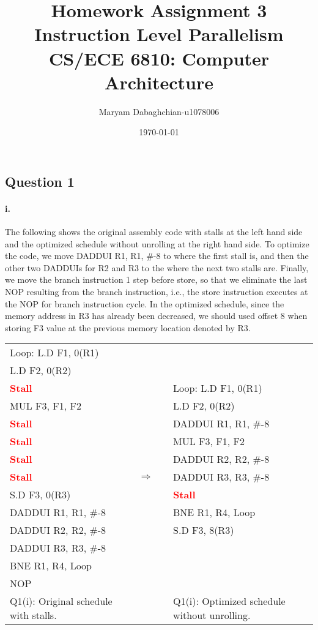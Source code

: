 \documentclass[11pt]{article}
\title{Homework Assignment 3\\
	Instruction Level Parallelism\\
	CS/ECE 6810: Computer Architecture}
\author{Maryam Dabaghchian-u1078006}
\date{\today}
\newcommand{\q}[1]{\subsection*{Question {#1}}}
\renewcommand{\part}[1]{\paragraph*{{#1}.}}
\newcommand{\code}[1]{\textsf{#1}}
\newcommand{\stall}{\textcolor{red}{\textbf{Stall}}}
\begin{document}
\maketitle

\q{1} 

\part{i} The following shows the original assembly code with stalls at the left hand side and the optimized schedule without unrolling at the right hand side. 
To optimize the code, we move \code{DADDUI R1, R1, \#-8} to where the first stall is, and then the other two \code{DADDUI}s for \code{R2} and \code{R3} to the where the next two stalls are. Finally, we move the branch instruction 1 step before store, so that we eliminate the last \code{NOP} resulting from the branch instruction, i.e., the store instruction executes at the \code{NOP} for branch instruction cycle. In the optimized schedule, since the memory address in \code{R3} has already been decreased, we should used offset 8 when storing \code{F3} value at the previous memory location denoted by \code{R3}.

\begin{table}[h]
\center
\begin{tabular}{lcccl}
	 \code{Loop:} \code{L.D F1, 0(R1)} & & & &  \\
	 \code{L.D F2, 0(R2)}  & & & & \\
	 \stall &  & & &  \code{Loop:} \code{L.D F1, 0(R1)} \\
	 \code{MUL F3, F1, F2}  & & & & \code{L.D F2, 0(R2)} \\
	 \stall &  & & & \code{DADDUI R1, R1, \#-8} \\
	 \stall & & & & \code{MUL F3, F1, F2}  \\
	 \stall & & & & \code{DADDUI R2, R2, \#-8}  \\
	 \stall & & $\Rightarrow$ & & \code{DADDUI R3, R3, \#-8}  \\
	 \code{S.D F3, 0(R3)} & & & & \stall  \\
	 \code{DADDUI R1, R1, \#-8} & & & &  \code{BNE R1, R4, Loop} \\
	 \code{DADDUI R2, R2, \#-8} & & & &  \code{S.D F3, 8(R3)} \\
	 \code{DADDUI R3, R3, \#-8} & & & &   \\
	 \code{BNE R1, R4, Loop} & & & &  \\
	 \code{NOP} & & & &  \\
	 Q1(i): Original schedule with stalls. & & & & Q1(i): Optimized schedule without unrolling.
\end{tabular}
\label{tbl:q1p1}
\end{table}
\end{document}
